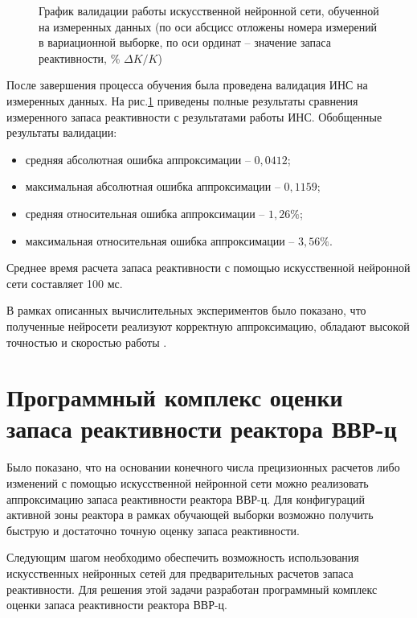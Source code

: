 \begin{figure}[p]
    \caption[График валидации ИНС на измеренных данных]{График валидации работы искусственной нейронной сети, обученной
    на измеренных данных (по оси абсцисс отложены номера измерений в
    вариационной выборке, по оси ординат -- значение запаса реактивности,
    \% $\Delta K/K$)}
    \label{pic:real-rus}
\end{figure}

После завершения процесса обучения была проведена валидация ИНС на измеренных данных.
На рис.\ref{pic:real-rus} приведены полные результаты сравнения
измеренного запаса реактивности с результатами работы ИНС.
Обобщенные результаты валидации:

\begin{itemize}
\item
  средняя абсолютная ошибка аппроксимации -- $0,0412$;
\item
  максимальная абсолютная ошибка аппроксимации -- $0,1159$;
\item
  средняя относительная ошибка аппроксимации -- $1,26\%$;
\item
  максимальная относительная ошибка аппроксимации -- $3,56\%$.
\end{itemize}

Среднее время расчета запаса реактивности с помощью искусственной
нейронной сети составляет 100 мс.

В рамках описанных вычислительных экспериментов было показано, что
полученные нейросети реализуют корректную аппроксимацию, обладают
высокой точностью и скоростью работы \cite{iop-2018}.

\section{Программный комплекс оценки запаса реактивности реактора ВВР-ц}

Было показано, что на основании конечного числа прецизионных расчетов либо изменений с помощью искусственной нейронной сети можно реализовать аппроксимацию запаса реактивности реактора ВВР-ц.
Для конфигураций активной зоны реактора в рамках обучающей выборки возможно получить быструю и достаточно точную оценку запаса реактивности.

Следующим шагом необходимо обеспечить возможность использования искусственных нейронных сетей для предварительных расчетов запаса реактивности.
Для решения этой задачи разработан программный комплекс оценки запаса реактивности реактора ВВР-ц.

